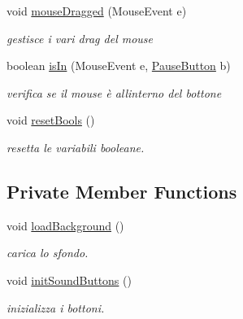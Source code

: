 \begin{DoxyCompactItemize}
void \hyperlink{classui_1_1_pause_overlay_adbfc0588c017133c9b7070474402b72f}{mouse\+Dragged} (Mouse\+Event e)
\begin{DoxyCompactList}\small\item\em gestisce i vari drag del mouse \end{DoxyCompactList}\item 
boolean \hyperlink{classui_1_1_pause_overlay_a1652ba7734cc8d8ba710d3ab10281b04}{is\+In} (Mouse\+Event e, \hyperlink{classui_1_1_pause_button}{Pause\+Button} b)
\begin{DoxyCompactList}\small\item\em verifica se il mouse è all\textquotesingle{}interno del bottone \end{DoxyCompactList}\item 
void \hyperlink{classui_1_1_pause_overlay_a4506144774b5a18385cf2eb0f4ff5e42}{reset\+Bools} ()
\begin{DoxyCompactList}\small\item\em resetta le variabili booleane. \end{DoxyCompactList}\end{DoxyCompactItemize}
\subsection*{Private Member Functions}
\begin{DoxyCompactItemize}
\item 
void \hyperlink{classui_1_1_pause_overlay_ab9e42b0ec1e9c9ffdf1edd5dec1b0ddd}{load\+Background} ()
\begin{DoxyCompactList}\small\item\em carica lo sfondo. \end{DoxyCompactList}\item 
void \hyperlink{classui_1_1_pause_overlay_a7f98f78449c3156b81769d481bf99f3c}{init\+Sound\+Buttons} ()
\begin{DoxyCompactList}\small\item\em inizializza i bottoni. \end{DoxyCompactList}\end{DoxyCompactItemize}

